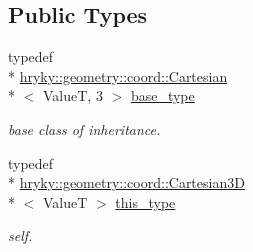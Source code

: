 \subsection*{Public Types}
\begin{DoxyCompactItemize}
\item 
\hypertarget{classhryky_1_1geometry_1_1coord_1_1_cartesian3_d_a15a346410509de147805b73f5a321771}{typedef \\*
\hyperlink{classhryky_1_1geometry_1_1coord_1_1_cartesian}{hryky\-::geometry\-::coord\-::\-Cartesian}\\*
$<$ Value\-T, 3 $>$ \hyperlink{classhryky_1_1geometry_1_1coord_1_1_cartesian3_d_a15a346410509de147805b73f5a321771}{base\-\_\-type}}\label{classhryky_1_1geometry_1_1coord_1_1_cartesian3_d_a15a346410509de147805b73f5a321771}

\begin{DoxyCompactList}\small\item\em base class of inheritance. \end{DoxyCompactList}\item 
\hypertarget{classhryky_1_1geometry_1_1coord_1_1_cartesian3_d_a1ef50122d4a9823040b3822fec550ae7}{typedef \\*
\hyperlink{classhryky_1_1geometry_1_1coord_1_1_cartesian3_d}{hryky\-::geometry\-::coord\-::\-Cartesian3\-D}\\*
$<$ Value\-T $>$ \hyperlink{classhryky_1_1geometry_1_1coord_1_1_cartesian3_d_a1ef50122d4a9823040b3822fec550ae7}{this\-\_\-type}}\label{classhryky_1_1geometry_1_1coord_1_1_cartesian3_d_a1ef50122d4a9823040b3822fec550ae7}

\begin{DoxyCompactList}\small\item\em self. \end{DoxyCompactList}\end{DoxyCompactItemize}
